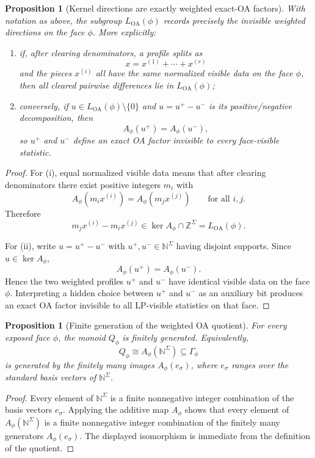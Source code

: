 \documentclass[11pt]{article}
\newtheorem{proposition}[theorem]{Proposition}
\theoremstyle{definition}
\newcommand{\N}{\mathbb{N}}
\newcommand{\Z}{\mathbb{Z}}
\newcommand{\1}{\mathbf{1}}
\begin{document}
\begin{proposition}[Kernel directions are exactly weighted exact-OA factors]\label{prop:weighted-oa-kernel}
With notation as above, the subgroup $L_{\mathrm{OA}}(\phi)$ records precisely the invisible weighted directions on the face $\phi$.
More explicitly:
\begin{enumerate}[label=(\roman*),leftmargin=2.2em]
\item if, after clearing denominators, a profile splits as
\[
x=x^{(1)}+\cdots+x^{(r)}
\]
and the pieces $x^{(i)}$ all have the same normalized visible data on the face $\phi$, then all cleared pairwise differences lie in $L_{\mathrm{OA}}(\phi)$;
\item conversely, if $u\in L_{\mathrm{OA}}(\phi)\setminus\{0\}$ and $u=u^+-u^-$ is its positive/negative decomposition, then
\[
A_\phi(u^+)=A_\phi(u^-),
\]
so $u^+$ and $u^-$ define an exact OA factor invisible to every face-visible statistic.
\end{enumerate}
\end{proposition}

\begin{proof}
For (i), equal normalized visible data means that after clearing denominators there exist positive integers $m_i$ with
\[
A_\phi(m_i x^{(i)})=A_\phi(m_j x^{(j)})
\qquad\text{for all }i,j.
\]
Therefore
\[
m_jx^{(i)}-m_ix^{(j)}\in \ker A_\phi\cap \Z^\Sigma=L_{\mathrm{OA}}(\phi).
\]

For (ii), write $u=u^+-u^-$ with $u^+,u^-\in \N^\Sigma$ having disjoint supports. Since $u\in \ker A_\phi$,
\[
A_\phi(u^+)=A_\phi(u^-).
\]
Hence the two weighted profiles $u^+$ and $u^-$ have identical visible data on the face $\phi$. Interpreting a hidden choice between $u^+$ and $u^-$ as an auxiliary bit produces an exact OA factor invisible to all LP-visible statistics on that face.
\end{proof}

\begin{proposition}[Finite generation of the weighted OA quotient]\label{prop:weighted-oa-fg}
For every exposed face $\phi$, the monoid $Q_\phi$ is finitely generated. Equivalently,
\[
Q_\phi\cong A_\phi(\N^\Sigma)\subseteq \Gamma_\phi
\]
is generated by the finitely many images $A_\phi(e_\sigma)$, where $e_\sigma$ ranges over the standard basis vectors of $\N^\Sigma$.
\end{proposition}

\begin{proof}
Every element of $\N^\Sigma$ is a finite nonnegative integer combination of the basis vectors $e_\sigma$. Applying the additive map $A_\phi$ shows that every element of $A_\phi(\N^\Sigma)$ is a finite nonnegative integer combination of the finitely many generators $A_\phi(e_\sigma)$. The displayed isomorphism is immediate from the definition of the quotient.
\end{proof}
\end{document}
